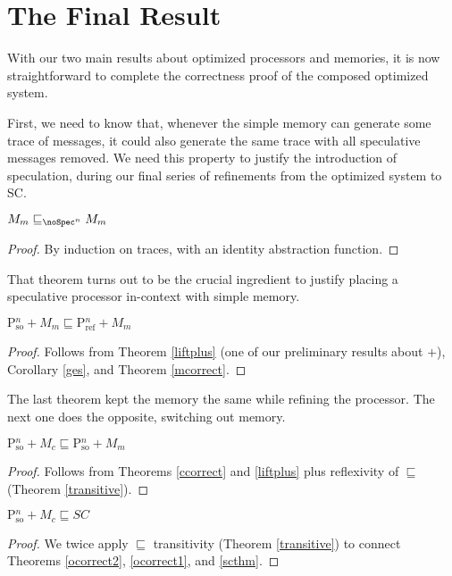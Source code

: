 \section{The Final Result}\label{sec:finalresult}

With our two main results about optimized processors and memories, it
is now straightforward to complete the correctness proof of the
composed optimized system.

First, we need to know that, whenever the simple memory can generate
some trace of messages, it could also generate the same trace with all
speculative messages removed.  We need this property to justify the
introduction of speculation, during our final series of refinements
from the optimized system to SC.

\begin{theorem}
\label{mcorrect}
$M_m \sqsubseteq_{\noSpec^n} M_m$
\end{theorem}
\begin{proof}
By induction on traces, with an identity abstraction function.
\end{proof}

That theorem turns out to be the crucial ingredient to justify placing
a speculative processor in-context with simple memory.

\begin{theorem}
\label{ocorrect1}
$\text{P$^n_\text{so}$} + M_m \sqsubseteq \text{P$^n_\text{ref}$} + M_m$
\end{theorem}
\begin{proof}
Follows from Theorem \ref{liftplus} (one of our preliminary results
about $+$), Corollary \ref{ges}, and Theorem \ref{mcorrect}.
\end{proof}

The last theorem kept the memory the same while refining the
processor.  The next one does the opposite, switching out memory.

\begin{theorem}
\label{ocorrect2}
$\text{P$^n_\text{so}$} + M_c \sqsubseteq \text{P$^n_\text{so}$} + M_m$
\end{theorem}
\begin{proof}
Follows from Theorems \ref{ccorrect} and \ref{liftplus} plus reflexivity of $\sqsubseteq$ (Theorem \ref{transitive}).
\end{proof}

\begin{theorem}
\label{ofull}
$\text{P$^n_\text{so}$} + M_c \sqsubseteq SC$
\end{theorem}
\begin{proof}
We twice apply $\sqsubseteq$ transitivity (Theorem \ref{transitive}) to
connect Theorems \ref{ocorrect2}, \ref{ocorrect1}, and \ref{scthm}.
\end{proof}
